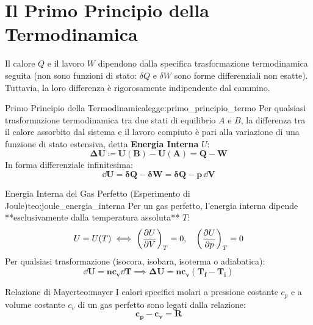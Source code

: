\section{Il Primo Principio della Termodinamica}
\label{sec:primo_principio}

Il calore $Q$ e il lavoro $W$ dipendono dalla specifica trasformazione termodinamica seguita (non sono funzioni di stato: $\delta Q$ e $\delta W$ sono forme differenziali non esatte). Tuttavia, la loro differenza è rigorosamente indipendente dal cammino.

\begin{legge}{Primo Principio della Termodinamica}{legge:primo_principio_termo}
Per qualsiasi trasformazione termodinamica tra due stati di equilibrio $A$ e $B$, la differenza tra il calore assorbito dal sistema e il lavoro compiuto è pari alla variazione di una funzione di stato estensiva, detta \textbf{Energia Interna} $U$:
\begin{equation}
    \mathbf{\Delta U \coloneqq U(B) - U(A) = Q - W}
    \label{eq:primo_principio}
\end{equation}
In forma differenziale infinitesima:
\begin{equation}
    \mathbf{\dd U = \delta Q - \delta W = \delta Q - p\,\dd V}
    \label{eq:primo_principio_diff}
\end{equation}
\end{legge}

\begin{teorema}{Energia Interna del Gas Perfetto (Esperimento di Joule)}{teo:joule_energia_interna}
Per un gas perfetto, l'energia interna dipende **esclusivamente dalla temperatura assoluta** $T$:
\begin{equation}
    U = U(T) \iff \left(\frac{\partial U}{\partial V}\right)_T = 0, \quad \left(\frac{\partial U}{\partial p}\right)_T = 0
    \label{eq:u_gas_perfetto}
\end{equation}
Per qualsiasi trasformazione (isocora, isobara, isoterma o adiabatica):
\begin{equation}
    \mathbf{\dd U = n c_v \dd T \implies \Delta U = n c_v (T_f - T_i)}
    \label{eq:delta_u_generale}
\end{equation}
\end{teorema}

\begin{teorema}{Relazione di Mayer}{teo:mayer}
I calori specifici molari a pressione costante $c_p$ e a volume costante $c_v$ di un gas perfetto sono legati dalla relazione:
\begin{equation}
    \mathbf{c_p - c_v = R}
    \label{eq:relazione_mayer}
\end{equation}
\end{teorema}

